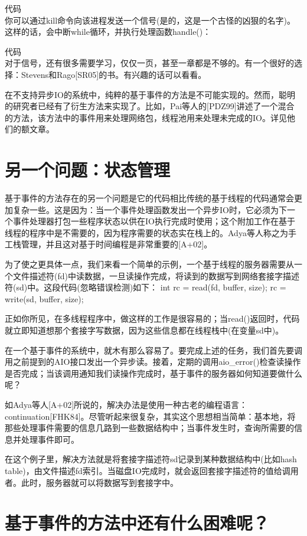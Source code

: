 代码\\

你可以通过kill命令向该进程发送一个信号(是的，这是一个古怪的凶狠的名字)。这样的话，会中断while循环，并执行处理函数handle()：

代码\\

对于信号，还有很多需要学习，仅仅一页，甚至一章都是不够的。有一个很好的选择：Stevens和Rago[SR05]的书。有兴趣的话可以看看。

在不支持异步IO的系统中，纯粹的基于事件的方法是不可能实现的。然而，聪明的研究者已经有了衍生方法来实现了。比如，Pai等人的[PDZ99]讲述了一个混合的方法，该方法中的事件用来处理网络包，线程池用来处理未完成的IO。详见他们的额文章。


\section{另一个问题：状态管理}

基于事件的方法存在的另一个问题是它的代码相比传统的基于线程的代码通常会更加复杂一些。这是因为：当一个事件处理函数发出一个异步IO时，它必须为下一个事件处理器打包一些程序状态以供在IO执行完成时使用；这个附加工作在基于线程的程序中是不需要的，因为程序需要的状态实在栈上的。Adya等人称之为手工栈管理，并且这对基于时间编程是非常重要的[A+02]。

为了使之更具体一点，我们来看一个简单的示例，一个基于线程的服务器需要从一个文件描述符(fd)中读数据，一旦读操作完成，将读到的数据写到网络套接字描述符(sd)中。这段代码(忽略错误检测)如下：
int rc = read(fd, buffer, size);
rc = write(sd, buffer, size);


正如你所见，在多线程程序中，做这样的工作是很容易的；当read()返回时，代码就立即知道想那个套接字写数据，因为这些信息都在线程栈中(在变量sd中)。

在一个基于事件的系统中，就木有那么容易了。要完成上述的任务，我们首先要调用之前提到的AIO接口发出一个异步读。接着，定期的调用aio\_error()检查读操作是否完成；当该调用通知我们读操作完成时，基于事件的服务器如何知道要做什么呢？

如Adya等人[A+02]所说的，解决办法是使用一种古老的编程语言：continuation[FHK84]。尽管听起来很复杂，其实这个思想相当简单：基本地，将那些处理事件需要的信息几路到一些数据结构中；当事件发生时，查询所需要的信息并处理事件即可。

在这个例子里，解决方法就是将套接字描述符sd记录到某种数据结构中(比如hash table)，由文件描述fd索引。当磁盘IO完成时，就会返回套接字描述符的值给调用者。此时，服务器就可以将数据写到套接字中。

\section{基于事件的方法中还有什么困难呢？}

